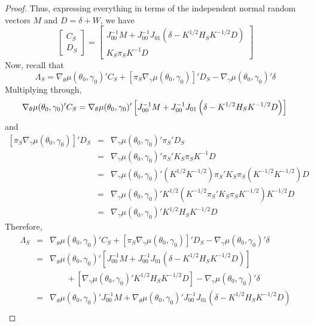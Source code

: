 \documentclass[12pt]{article}
\theoremstyle{definition}
\begin{document}
\begin{proof}
Thus, expressing everything in terms of the independent normal random vectors $M$ and $D = \delta + W$, we have
	$$
	\left[\begin{array}{c}
		C_S\\
		D_S
	\end{array}\right] = 	\left[\begin{array}{c}
		 J_{00}^{-1}M + J_{00}^{-1}J_{01}\left(\delta -  K^{1/2}H_SK^{-1/2}D\right)\\
		K_S \pi_S K^{-1}D
	\end{array}\right] 
$$
Now, recall that
	$$
	\Lambda_S  = \nabla_{\theta}\mu(\theta_0, \gamma_0)'C_S + \left[\pi_S\nabla_\gamma \mu(\theta_0, \gamma_0)\right]'D_S - \nabla_\gamma \mu(\theta_0,\gamma_0)'\delta
$$
Multiplying through,
	$$
			\nabla_{\theta}\mu(\theta_0, \gamma_0)'C_S = 		 \nabla_{\theta}\mu(\theta_0, \gamma_0)'\left[J_{00}^{-1}M + J_{00}^{-1}J_{01}\left(\delta -  K^{1/2}H_SK^{-1/2}D\right)\right]\\
$$
and
	\begin{eqnarray*}
			\left[\pi_S\nabla_\gamma \mu(\theta_0, \gamma_0)\right]'D_S &=& \nabla_\gamma \mu(\theta_0, \gamma_0)'\pi_S' D_S\\
		&=&\nabla_\gamma \mu(\theta_0, \gamma_0)'\pi_S'  K_S \pi_S
 K^{-1}D\\
		&=&\nabla_\gamma \mu(\theta_0, \gamma_0)' \left(K^{1/2}K^{-1/2}\right)\pi_S'  K_S \pi_S
 \left(K^{-1/2}K^{-1/2}\right)D\\
		&=&\nabla_\gamma \mu(\theta_0, \gamma_0)' K^{1/2}\left(K^{-1/2}\pi_S'  K_S \pi_S
K^{-1/2}\right)K^{-1/2}D\\
		&=&\nabla_\gamma \mu(\theta_0, \gamma_0)' K^{1/2}H_S K^{-1/2}D
\end{eqnarray*}
Therefore,
	\begin{eqnarray*}
		\Lambda_S &=& \nabla_{\theta}\mu(\theta_0, \gamma_0)'C_S + \left[\pi_S\nabla_\gamma \mu(\theta_0, \gamma_0)\right]'D_S - \nabla_\gamma \mu(\theta_0,\gamma_0)'\delta\\
			&=& \nabla_{\theta}\mu(\theta_0, \gamma_0)'\left[J_{00}^{-1}M + J_{00}^{-1}J_{01}\left(\delta -  K^{1/2}H_SK^{-1/2}D\right)\right]\\
			&& \;\;\;\;\;\;\; + \left[\nabla_\gamma \mu(\theta_0, \gamma_0)' K^{1/2}H_S K^{-1/2}D\right] - \nabla_\gamma \mu(\theta_0,\gamma_0)'\delta\\
			&=&\nabla_{\theta}\mu(\theta_0, \gamma_0)'J_{00}^{-1}M + \nabla_{\theta}\mu(\theta_0, \gamma_0)' J_{00}^{-1}J_{01}\left(\delta -  K^{1/2}H_SK^{-1/2}D\right)\\

\end{eqnarray*}
\end{proof}
\end{document}
